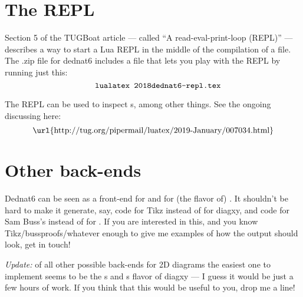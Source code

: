 \documentclass[oneside]{article}
\def\msk{\medskip}
\begin{document}
\msk



\newpage

%
\section{The REPL}

Section 5 of the TUGBoat article --- called ``A read-eval-print-loop
(REPL)'' --- describes a way to start a Lua REPL in the middle of the
compilation of a  file. The .zip file for dednat6 includes a
file  that lets you play with the REPL by
running just this:
%
$$\text{\co{lualatex 2018dednat6-repl.tex}}$$

The REPL can be used to inspect \qco{\\def}s, among other things. See
the ongoing discussing here:
%
$$\text{\url{http://tug.org/pipermail/luatex/2019-January/007034.html}}$$



%                                                  
\section{Other back-ends}

Dednat6 can be seen as a front-end for  and for (the
\qco{\\morphism} flavor of) . It shouldn't be hard to
make it generate, say, code for Tikz instead of for diagxy, and code
for Sam Buss's  instead of for . If
you are interested in this, and you know Tikz/bussproofs/whatever
enough to give me examples of how the output should look, get in
touch!

{\sl Update:} of all other possible back-ends for 2D diagrams the
easiest one to implement seems to be the \qco{\\node}s and
\qco{\\arrow}s flavor of diagxy --- I guess it would be just a few
hours of work. If you think that this would be useful to you, drop me
a line!
\end{document}
